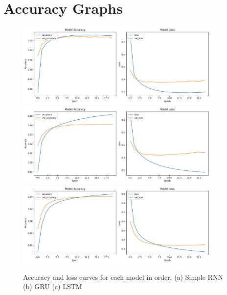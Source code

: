 \documentclass{article}
\begin{document}


\appendix
\section{Accuracy Graphs}
\begin{figure}[htbp]
  \centering
  \includegraphics[width=0.9\textwidth]{ML_images/simpleRNNGraphs.png}
  \hfill
  \includegraphics[width=0.9\textwidth]{ML_images/GRUgraphs.png}
  \hfill
  \includegraphics[width=0.9\textwidth]{ML_images/LSTMGraphs.png}
  \caption{Accuracy and loss curves for each model in order: (a) Simple RNN (b) GRU (c) LSTM}
  \label{fig:all_curves}
  \end{figure}
\end{document}
